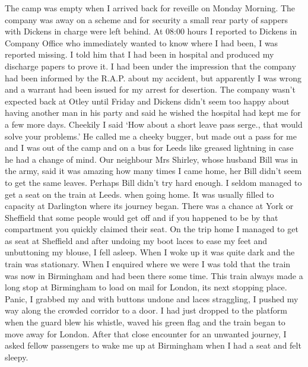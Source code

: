 The camp was empty when I arrived back for reveille on Monday
Morning. The company was away on a scheme and for security a small
rear party of sappers with \sergeant Dickens in charge were left
behind. At 08:00 hours I reported to \sergeant Dickens in Company Office
who immediately wanted to know where I had been, I was reported
missing. I told him that I had been in hospital and produced my
discharge papers to prove it. I had been under the impression that the
company had been informed by the R.A.P. about my accident, but apparently
I was wrong and a warrant had been issued for my arrest for
desertion. The company wasn't expected back at Otley until Friday and
\sergeant Dickens didn't seem too happy about having another man in his
party and said he wished the hospital had kept me for a few more
days. Cheekily I said `How about a short leave pass serge., that would
solve your problems.' He called me a cheeky bugger, but made out a
pass for me and I was out of the camp and on a bus for Leeds like
greased lightning in case he had a change of mind. Our neighbour Mrs
Shirley, whose husband Bill was in the army, said it was amazing how
many times I came home, her Bill didn't seem to get the same
leaves. Perhaps Bill didn't try hard enough. I seldom managed to get a
seat on the train at Leeds. when going home. It was usually filled to
capacity at Darlington where its journey began. There was a chance at
York or Sheffield that some people would get off and if you happened
to be by that compartment you quickly claimed their seat. On the trip
home I managed to get as seat at Sheffield and after undoing my boot
laces to ease my feet and unbuttoning my blouse, I fell asleep. When I
woke up it was quite dark and the train was stationary. When I
enquired where we were I was told that the train was now in Birmingham
and had been there some time. This train always made a long stop at
Birmingham to load on mail for London, its next stopping place. Panic,
I grabbed my and with buttons undone and laces straggling, I pushed my
way along the crowded corridor to a door. I had just dropped to the
platform when the guard blew his whistle, waved his green flag and the
train began to move away for London. After that close encounter for an
unwanted journey, I asked fellow passengers to wake me up at
Birmingham when I had a seat and felt sleepy.

